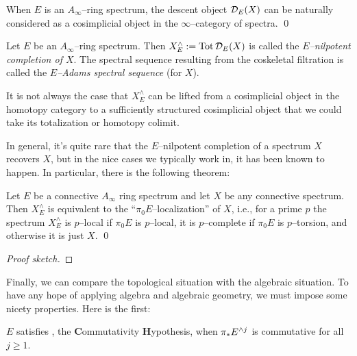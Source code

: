 \begin{lemma}
When $E$ is an $A_\infty$--ring spectrum, the descent object $\mathcal{D}_E(X)$ can be naturally considered as a cosimplicial object in the $\infty$--category of spectra. \qed {}
\end{lemma}
\begin{definition}\label{DefnOfNilpCompletionAndASS}
Let $E$ be an $A_\infty$--ring spectrum.  Then $X^\wedge_E := \operatorname{Tot} \mathcal{D}_E(X)$ is called the \textit{$E$--nilpotent completion of $X$}.  The spectral sequence resulting from the coskeletal filtration is called the \textit{$E$--Adams spectral sequence} (for $X$).
\end{definition}
It is not always the case that $X^\wedge_E$ can be lifted from a cosimplicial object in the homotopy category to a sufficiently structured cosimplicial object that we could take its totalization or homotopy colimit.

In general, it's quite rare that the $E$--nilpotent completion of a spectrum $X$ recovers $X$, but in the nice cases we typically work in, it has been known to happen.  In particular, there is the following theorem:
\begin{lemma}
Let $E$ be a connective $A_\infty$ ring spectrum and let $X$ be any connective spectrum.  Then $X^\wedge_E$ is equivalent to the ``$\pi_0 E$--localization'' of $X$, i.e., for a prime $p$ the spectrum $X^\wedge_E$ is $p$--local if $\pi_0 E$ is $p$--local, it is $p$--complete if $\pi_0 E$ is $p$--torsion, and otherwise it is just $X$. \qed
\end{lemma}
\begin{proof}[Proof sketch]
\end{proof}

Finally, we can compare the topological situation with the algebraic situation.  To have any hope of applying algebra and algebraic geometry, we must impose some nicety properties.  Here is the first:

\begin{definition}
$E$ satisfies \CH, the \textbf Commutativity \textbf Hypothesis, when $\pi_* E^{\wedge j}$ is commutative for all $j \ge 1$.
\end{definition}

